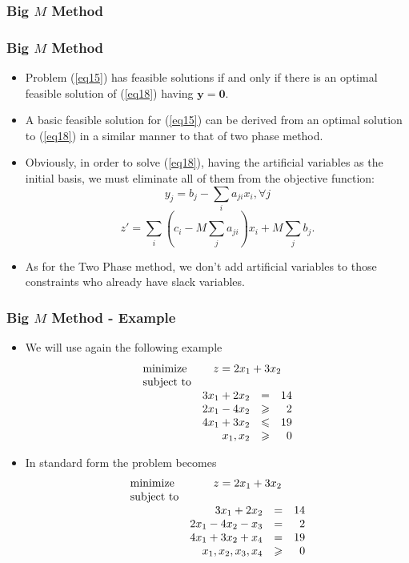 \documentclass{beamer}
\theoremstyle{plain}
\let\le\leqslant
\let\ge\geqslant
\def\y{{\mathrm y}}
\def\y{{\mathbf y}}
\def\zero{{\mathbf 0}}
\begin{document}
\subsubsection{Big $ M $ Method}
\begin{frame}\frametitle{Big $ M $ Method}
\justifying

\begin{itemize}
\justifying

\item Problem (\ref{eq15}) has feasible solutions if and only if there is an optimal feasible solution of (\ref{eq18})  having $ \y = \zero $. 

\item A basic feasible solution for (\ref{eq15}) can be derived from an optimal solution to (\ref{eq18}) in a similar manner to that of two phase method.

\item Obviously, in order to solve (\ref{eq18}), having the artificial variables as the initial basis, we must eliminate all of them from the objective function:
\[ y_j = b_j - \sum_ia_{ji}x_i, \forall j\]
\[ z' = \sum_i\left( c_i - M\sum_ja_{ji} \right)x_i + M\sum_jb_j. \]

\item As for the Two Phase method, we don't add artificial variables to those constraints who already have slack variables.

\end{itemize}

\end{frame}
\begin{frame}\frametitle{Big $ M $ Method - Example}
\justifying

\begin{itemize}
\justifying

\item We will use again the following example
\[ \begin{array}{lrcr}
\textrm{minimize} & \multicolumn{3}{c}{z = 2x_1 + 3x_2}  \\
\textrm{subject to} & \\
& 3x_1 + 2x_2 & = & 14 \\
& 2x_1 - 4x_2 & \ge & 2 \\
& 4x_1 + 3x_2 & \le & 19 \\
& x_1, x_2 & \ge & 0
\end{array}
\]

\item In standard form the problem becomes
\[ \begin{array}{lrcr}
\textrm{minimize} & \multicolumn{3}{c}{z = 2x_1 + 3x_2}  \\
\textrm{subject to} & \\
& 3x_1 + 2x_2 & = & 14 \\
& 2x_1 - 4x_2 - x_3 & = & 2 \\
& 4x_1 + 3x_2 + x_4 & = & 19 \\
& x_1, x_2, x_3, x_4 & \ge & 0
\end{array}
\]

\end{itemize}

\end{frame}
\end{document}
